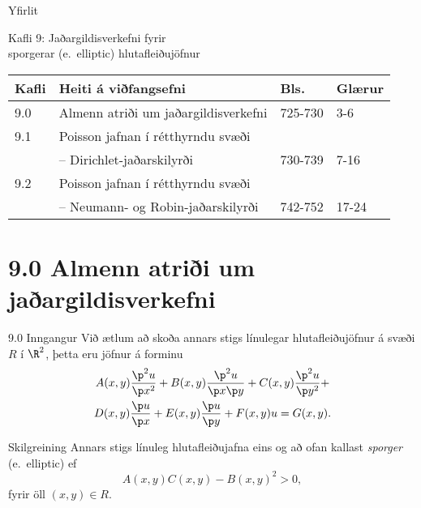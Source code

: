 \date{30.~mars og 11.~apríl, 2012}



\begin{frame}
	\maketitle
\end{frame}

\begin{frame}{Yfirlit}
\begin{block}{Kafli 9: Jaðargildisverkefni fyrir \\
  sporgerar (e.~elliptic) hlutafleiðujöfnur}
\begin{center}
\begin{tabular}{|l|l|l|l|}\hline
Kafli &Heiti á viðfangsefni & Bls. & Glærur\\
\hline
9.0 &Almenn atriði um jaðargildisverkefni & 725-730 & 3-6\\
9.1 &Poisson jafnan í rétthyrndu svæði & & \\
   &--  Dirichlet-jaðarskilyrði & 730-739 & 7-16\\
9.2 &Poisson jafnan í rétthyrndu svæði & & \\
    &-- Neumann- og Robin-jaðarskilyrði  & 742-752 & 17-24\\ \hline
\end{tabular}
\end{center}
\end{block}
\end{frame}

\section*{9.0 Almenn atriði um jaðargildisverkefni}

\begin{frame}{9.0 Inngangur}
Við ætlum að skoða annars stigs línulegar hlutafleiðujöfnur á svæði
$R$ í $\R^2$, \pause þetta eru jöfnur á forminu
\begin{multline}
A(x,y)\frac{\p^2 u}{\p x^2} + B(x,y)\frac{\p^2 u}{\p x\p y} + C(x,y)\frac{\p^2 u}{\p y^2} +\\
D(x,y)\frac{\p u}{\p x} + E(x,y)\frac{\p u}{\p y} + F(x,y)u = G(x,y).
\end{multline}
\begin{block}{Skilgreining}
 Annars stigs línuleg hlutafleiðujafna eins og að ofan kallast \emph{sporger}
 (e.~elliptic) ef 
 $$
  A(x,y)C(x,y) - B(x,y)^2 > 0,
 $$
 fyrir öll $(x,y) \in R$.
\end{block}

\end{frame}


